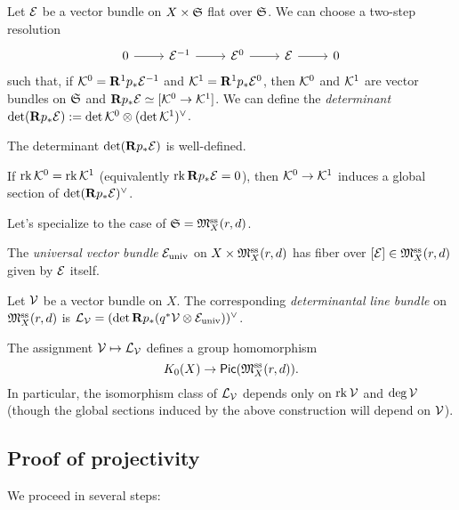 \documentclass{amsart}
\begin{document}
Let $\mathcal{E}$ be a vector bundle on $X \times \mathfrak{S}$ flat over $\mathfrak{S}$.
We can choose a two-step resolution
\[
	\SES{\Ec^{-1}}{\Ec^0}{\Ec}
\]
such that, if $\mathcal{K}^0 = \mathbf{R}^1 p_* \mathcal{E}^{-1}$ and $\mathcal{K}^1 = \mathbf{R}^1 p_* \mathcal{E}^0$, then $\mathcal{K}^0$ and $\mathcal{K}^1$ are vector bundles on $\mathfrak{S}$ and $\mathbf{R} p_* \mathcal{E} \simeq [\mathcal{K}^0 \to \mathcal{K}^1]$.
We can define the \emph{determinant} $\det(\mathbf{R} p_* \mathcal{E}) := \det \mathcal{K}^0 \otimes (\det \mathcal{K}^1)^\vee$.

\begin{prop}
	The determinant $\det(\mathbf{R} p_* \mathcal{E})$ is well-defined.
\end{prop}

If $\operatorname{rk} \mathcal{K}^0 = \operatorname{rk} \mathcal{K}^1$ (equivalently $\operatorname{rk} \mathbf{R} p_* \mathcal{E} = 0$), then $\mathcal{K}^0 \to \mathcal{K}^1$ induces a global section of $\det (\mathbf{R} p_* \mathcal{E})^\vee$.

Let's specialize to the case of $\mathfrak{S} = \mathfrak{M}_X^{\mathrm{ss}}(r, d)$.

\begin{dfn}
	The \emph{universal vector bundle} $\mathcal{E}_{\mathrm{univ}}$ on $X \times \mathfrak{M}_X^{\mathrm{ss}}(r, d)$ has fiber over $[\mathcal{E}] \in \mathfrak{M}_X^{\mathrm{ss}}(r, d)$ given by $\mathcal{E}$ itself.
\end{dfn}

\begin{dfn}
	Let $\mathcal{V}$ be a vector bundle on $X$.
	The corresponding \emph{determinantal line bundle} on $\mathfrak{M}_X^{\mathrm{ss}}(r, d)$ is $\mathcal{L}_{\mathcal{V}} = (\det \mathbf{R} p_*(q^* \mathcal{V} \otimes \mathcal{E}_{\mathrm{univ}}))^\vee$.
\end{dfn}

\begin{prop}
	The assignment $\mathcal{V} \mapsto \mathcal{L}_{\mathcal{V}}$ defines a group homomorphism
	\[
		K_0(X) \to \mathsf{Pic}(\mathfrak{M}_X^{\mathrm{ss}}(r, d)).
	\]
	In particular, the isomorphism class of $\mathcal{L}_{\mathcal{V}}$ depends only on $\operatorname{rk} \mathcal{V}$ and $\deg \mathcal{V}$ (though the global sections induced by the above construction will depend on $\mathcal{V}$).
\end{prop}

\subsection{Proof of projectivity}

We proceed in several steps:
\end{document}
